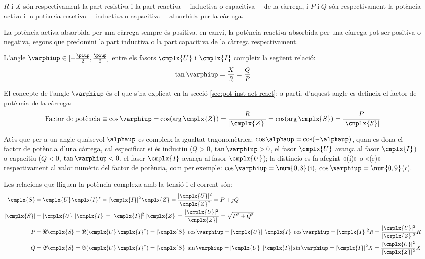 $R$ i $X$ són respectivament la part resistiva i la part reactiva ---inductiva o capacitiva--- de la càrrega, i $P$ i $Q$ són
respectivament la potència activa i la potència reactiva ---inductiva
o capacitiva--- absorbida per la càrrega.

La potència activa absorbida per una càrrega sempre és positiva, en
canvi, la potència reactiva absorbida per una càrrega pot ser
positiva o negativa, segons que predomini la part inductiva o la
part capacitiva de la càrrega respectivament.

L'angle $\varphiup\in[-\frac{\piup}{2},\frac{\piup}{2}]$ entre els fasors $\cmplx{U}$ i $\cmplx{I}$ compleix la següent relació:
\begin{equation}
   \tan\varphiup = \frac{X}{R} = \frac{Q}{P}
\end{equation}

El concepte de l'angle $\varphiup$ és el  que s'ha explicat en la secció \ref{sec:pot-inst-act-react}; a partir d'aquest angle es
defineix el factor de potència de la càrrega:
\begin{equation}
   \text{Factor de potència} \equiv \cos\varphiup = \cos (\arg \cmplx{Z}) = 
   \frac{R}{|\cmplx{Z}|} =
   \cos (\arg \cmplx{S}) =
   \frac{P}{|\cmplx{S}|}
\end{equation}

Atès que per a un angle qualsevol $\alphaup$ es compleix la igualtat
trigonomètrica: $\cos\alphaup = \cos(-\alphaup)$, quan es dona el factor
de potència d'una càrrega, cal especificar si és inductiu ($Q>0$,
$\tan\varphiup>0$, el fasor $\cmplx{U}$ avança al fasor $\cmplx{I}$) o
capacitiu ($Q<0$, $\tan\varphiup<0$, el fasor $\cmplx{I}$ avança al fasor $\cmplx{U}$); la distinció es fa
afegint «(i)» o «(c)» respectivament al valor numèric del factor
de potència, com per exemple: $\cos\varphiup=\num{0,8}$(i),
$\cos\varphiup=\num{0,9}$(c).

Les relacions que lliguen la potència complexa amb la tensió i el corrent són:
\begin{align}
   \cmplx{S} &=  \cmplx{U} \,\cmplx{I}^* =
   |\cmplx{I}|^2 \,\cmplx{Z} = \frac{|\cmplx{U}|^2}{\cmplx{Z}^*} =
   P + j Q \label{eq:s_mono1}\\
   |\cmplx{S}| &= |\cmplx{U}| \,|\cmplx{I}| =
   |\cmplx{I}|^2 \,|\cmplx{Z}| = \frac{|\cmplx{U}|^2}{|\cmplx{Z}|} =
   \sqrt{P^2+Q^2} \\
   P &= \Re\cmplx{S} = \Re (\cmplx{U} \, \cmplx{I}^*) = |\cmplx{S}| \cos\varphiup =
   |\cmplx{U}|\, |\cmplx{I}| \cos\varphiup = |\cmplx{I}|^2 R =
   \frac{|\cmplx{U}|^2}{|\cmplx{Z}|^2}R\\
   Q &= \Im\cmplx{S} = \Im (\cmplx{U} \, \cmplx{I}^*) = |\cmplx{S}| \sin\varphiup =
   |\cmplx{U}| \,|\cmplx{I}|\sin\varphiup  = |\cmplx{I}|^2 X =
   \frac{|\cmplx{U}|^2}{|\cmplx{Z}|^2}X
\end{align}

